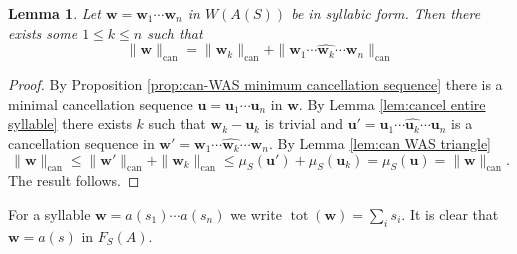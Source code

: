 \documentclass[12pt]{amsart}
\newtheorem{lemma}[prop]{Lemma}
\theoremstyle{definition}
\newcommand{\B}[1]{\mathbf{#1}}
\newcommand{\OP}[1]{\operatorname{#1}}
\def\can{\text{can}}
\def\Free{F}
\begin{document}
\begin{lemma}\label{lem:can norm WAS splitting} %
Let $\B w = \B w_1 \cdots \B w_n$ in $W(A(S))$ be in syllabic form. 
Then there exists some $1 \leq k \leq n$ such that 
\[
\| \B w \|_{\can} =  \| \B w_k\|_{\can} +  \| \B w_1 \cdots \widehat{\B w_k} \cdots \B w_n\|_{\can}
\]
\end{lemma}

\begin{proof}
By Proposition \ref{prop:can-WAS minimum cancellation sequence} there is a minimal cancellation sequence $\B u = \B u_1 \cdots \B u_n$ in $\B w$.
By Lemma \ref{lem:cancel entire syllable} there exists $k$ such that $\B w_k - \B u_k$ is trivial and $\B u' = \B u_1 \cdots \widehat{\B u_k} \cdots \B u_n$ is a cancellation sequence in $\B w' = \B w_1 \cdots \widehat{\B w_k} \cdots \B w_n$.
By Lemma \ref{lem:can WAS triangle}
\[
\| \B w \|_{\can}
\leq 
\| \B w' \|_{\can} + \| \B w_k \|_{\can}
\leq
\mu_S(\B u')+\mu_S(\B u_k)
= \mu_S(\B u)
= \| \B w\|_{\can}.
\]
The result follows.

\end{proof}




For a syllable $\B w = a(s_1) \cdots a(s_n)$ we write $\OP{tot}(\B w)=\sum_i s_i$.
It is clear that $\B w = a(s)$ in $\Free_S(A)$.
\end{document}
